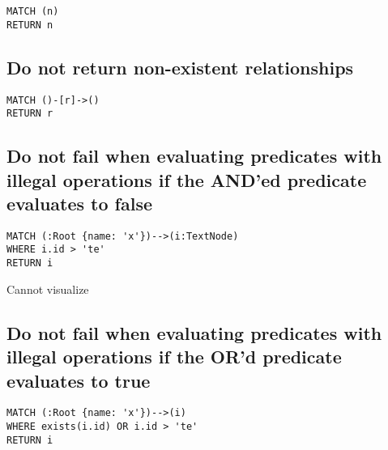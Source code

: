 \begin{lstlisting}
MATCH (n)
RETURN n
\end{lstlisting}

\subsection{Do not return non-existent relationships}

\begin{lstlisting}
MATCH ()-[r]->()
RETURN r
\end{lstlisting}

\subsection{Do not fail when evaluating predicates with illegal operations if the AND'ed predicate evaluates to false}

\begin{lstlisting}
MATCH (:Root {name: 'x'})-->(i:TextNode)
WHERE i.id > 'te'
RETURN i
\end{lstlisting}

Cannot visualize
\subsection{Do not fail when evaluating predicates with illegal operations if the OR'd predicate evaluates to true}

\begin{lstlisting}
MATCH (:Root {name: 'x'})-->(i)
WHERE exists(i.id) OR i.id > 'te'
RETURN i
\end{lstlisting}

